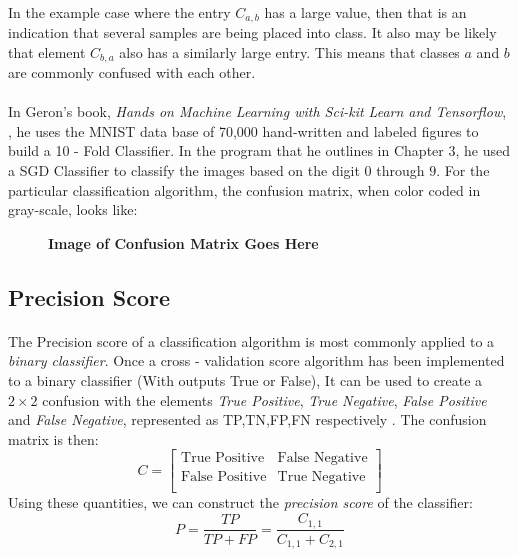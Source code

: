 \documentclass[12pt,letterpaper]{article}
\begin{document}
\paragraph*{}In the example case where the entry $C_{a,b}$ has a large value, then that is an indication that several samples are being placed into class. It also may be likely that element $C_{b,a}$ also has a similarly large entry. This means that classes $a$ and $b$ are commonly confused with each other. 
\paragraph*{}In Geron's book, \textit{Hands on Machine Learning with Sci-kit Learn and Tensorflow}, \cite{Geron}, he uses the MNIST data base of 70,000 hand-written and labeled figures to build a 10 - Fold Classifier. In the program that he outlines in Chapter 3, he used a SGD Classifier to classify the images based on the digit $0$ through $9$. For the particular classification algorithm, the confusion matrix, when color coded in gray-scale, looks like:
\begin{figure}[H]
\begin{center}
\textbf{Image of Confusion Matrix Goes Here}
\end{center}
\end{figure}



\subsection{Precision Score}
\paragraph*{}The Precision score of a classification algorithm is most commonly applied to a \textit{binary classifier}. Once a cross - validation score algorithm has been implemented to a binary classifier (With outputs \textsf{True} or \textsf{False}), It can be used to create a $2 \times 2$ confusion with the elements \textit{True Positive}, \textit{True Negative}, \textit{False Positive} and \textit{False Negative}, represented as TP,TN,FP,FN respectively \cite{James}. The confusion matrix is then:
\begin{equation}
C = 
\begin{bmatrix}
\text{True Positive} & \text{False Negative} \\
\text{False Positive} & \text{True Negative} \\
\end{bmatrix}
\end{equation}
Using these quantities, we can construct the \textit{precision score} of the classifier:
\begin{equation}
\label{precsision score}
P = \frac{TP}{TP + FP} = \frac{C_{1,1}}{C_{1,1}+C_{2,1}}
\end{equation}
\end{document}
